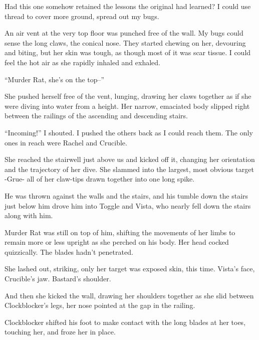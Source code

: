 Had this one somehow retained the lessons the original had learned?  I could use thread to cover more ground, spread out my bugs.



An air vent at the very top floor was punched free of the wall.  My bugs could sense the long claws, the conical nose.  They started chewing on her, devouring and biting, but her skin was tough, as though most of it was scar tissue.  I could feel the hot air as she rapidly inhaled and exhaled.



``Murder Rat, she's on the top--''



She pushed herself free of the vent, lunging, drawing her claws together as if she were diving into water from a height.  Her narrow, emaciated body slipped right between the railings of the ascending and descending stairs.



``Incoming!'' I shouted.  I pushed the others back as I could reach them.  The only ones in reach were Rachel and Crucible.



She reached the stairwell just above us and kicked off it, changing her orientation and the trajectory of her dive.  She slammed into the largest, most obvious target -Grue- all of her claw-tips drawn together into one long spike.



He was thrown against the walls and the stairs, and his tumble down the stairs just below him drove him into Toggle and Vista, who nearly fell down the stairs along with him.



Murder Rat was still on top of him, shifting the movements of her limbs to remain more or less upright as she perched on his body.  Her head cocked quizzically.  The blades hadn't penetrated.



She lashed out, striking, only her target was exposed skin, this time.  Vista's face, Crucible's jaw.  Bastard's shoulder.



And then she kicked the wall, drawing her shoulders together as she slid between Clockblocker's legs, her nose pointed at the gap in the railing.



Clockblocker shifted his foot to make contact with the long blades at her toes, touching her, and froze her in place.



